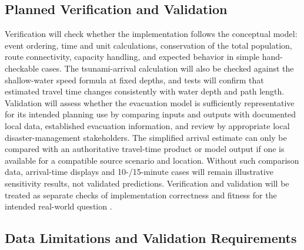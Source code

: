 \documentclass[conference]{IEEEtran}
\begin{document}
\subsection{Planned Verification and Validation}

Verification will check whether the implementation follows the conceptual model: event ordering, time and unit calculations, conservation of the total population, route connectivity, capacity handling, and expected behavior in simple hand-checkable cases. The tsunami-arrival calculation will also be checked against the shallow-water speed formula at fixed depths, and tests will confirm that estimated travel time changes consistently with water depth and path length. Validation will assess whether the evacuation model is sufficiently representative for its intended planning use by comparing inputs and outputs with documented local data, established evacuation information, and review by appropriate local disaster-management stakeholders. The simplified arrival estimate can only be compared with an authoritative travel-time product or model output if one is available for a compatible source scenario and location. Without such comparison data, arrival-time displays and 10-/15-minute cases will remain illustrative sensitivity results, not validated predictions. Verification and validation will be treated as separate checks of implementation correctness and fitness for the intended real-world question \cite{sargent,noaaprop}.

\subsection{Data Limitations and Validation Requirements}
\end{document}
